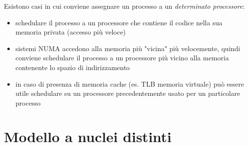 Esistono casi in cui conviene assegnare un processo a un \textit{determinato processore}:
\begin{itemize}
    \item schedulare il processo a un processore che contiene il codice nella sua memoria privata (accesso più veloce)
    \item sistemi NUMA accedono alla memoria più "vicina" più velocemente, quindi conviene schedulare il processo a un processore più vicino alla memoria contenente lo spazio di indirizzamento
    \item in caso di presenza di memoria cache (es. TLB memoria virtuale) può essere utile schedulare su un processore precedentemente usato per un particolare processo
\end{itemize}

\section{Modello a nuclei distinti}



















































































































